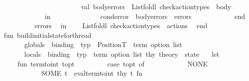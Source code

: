 \begin{isabellebody}
\ \ \ \ \ \ \ \ \isanewline
\ \ \ \ \ \ \ \ \ \ \ \ \ \ val\ body{\isacharunderscore}{\kern0pt}errors\ {\isacharequal}{\kern0pt}\ List{\isachardot}{\kern0pt}foldl\ check{\isacharunderscore}{\kern0pt}action{\isacharunderscore}{\kern0pt}types\ {\isacharbrackleft}{\kern0pt}{\isacharbrackright}{\kern0pt}\ body\isanewline
\ \ \ \ \ \ \ \ \ \ \ \ in\isanewline
\ \ \ \ \ \ \ \ \ \ \ \ \ \ cond{\isacharunderscore}{\kern0pt}error\ {\isacharat}{\kern0pt}\ body{\isacharunderscore}{\kern0pt}errors\ {\isacharat}{\kern0pt}\ errors\isanewline
\ \ \ \ \ \ \ \ \ \ \ \ end\isanewline
\isanewline
\ \ \ \ \ \ {\isacharbar}{\kern0pt}\ {\isacharunderscore}{\kern0pt}\ {\isacharequal}{\kern0pt}{\isachargreater}{\kern0pt}\ errors\isanewline
\isanewline
\ \ in\isanewline
\ \ \ \ List{\isachardot}{\kern0pt}foldl\ check{\isacharunderscore}{\kern0pt}action{\isacharunderscore}{\kern0pt}types\ {\isacharbrackleft}{\kern0pt}{\isacharbrackright}{\kern0pt}\ actions\isanewline
\ \ end\isanewline
\isanewline
fun\ build{\isacharunderscore}{\kern0pt}initial{\isacharunderscore}{\kern0pt}state{\isacharunderscore}{\kern0pt}for{\isacharunderscore}{\kern0pt}thread\ \isanewline
\ \ \ \ \ \ {\isacharparenleft}{\kern0pt}globals\ {\isacharcolon}{\kern0pt}\ {\isacharparenleft}{\kern0pt}binding\ {\isacharasterisk}{\kern0pt}\ typ\ {\isacharasterisk}{\kern0pt}\ Position{\isachardot}{\kern0pt}T\ {\isacharasterisk}{\kern0pt}\ term\ option{\isacharparenright}{\kern0pt}\ list{\isacharparenright}{\kern0pt}\ \isanewline
\ \ \ \ \ \ {\isacharparenleft}{\kern0pt}locals\ {\isacharcolon}{\kern0pt}\ {\isacharparenleft}{\kern0pt}{\isacharparenleft}{\kern0pt}binding\ {\isacharasterisk}{\kern0pt}\ typ{\isacharparenright}{\kern0pt}\ {\isacharasterisk}{\kern0pt}\ term\ option{\isacharparenright}{\kern0pt}\ list{\isacharparenright}{\kern0pt}\ {\isacharparenleft}{\kern0pt}thy{\isacharcolon}{\kern0pt}\ theory{\isacharparenright}{\kern0pt}\ {\isacharcolon}{\kern0pt}\ state\ {\isacharequal}{\kern0pt}\isanewline
\ \ let\isanewline
\ \ \ \ fun\ term{\isacharunderscore}{\kern0pt}to{\isacharunderscore}{\kern0pt}int\ t{\isacharunderscore}{\kern0pt}opt\ {\isacharequal}{\kern0pt}\isanewline
\ \ \ \ \ \ \ \ case\ t{\isacharunderscore}{\kern0pt}opt\ of\isanewline
\ \ \ \ \ \ \ \ \ \ \ \ NONE\ {\isacharequal}{\kern0pt}{\isachargreater}{\kern0pt}\ {}\isanewline
\ \ \ \ \ \ \ \ \ \ {\isacharbar}{\kern0pt}\ SOME\ t\ {\isacharequal}{\kern0pt}{\isachargreater}{\kern0pt}\ eval{\isacharunderscore}{\kern0pt}term{\isacharunderscore}{\kern0pt}to{\isacharunderscore}{\kern0pt}int\ thy\ t\ {\isacharparenleft}{\kern0pt}fn\ {\isacharunderscore}{\kern0pt}\ {\isacharequal}{\kern0pt}{\isachargreater}{\kern0pt}\ {}{\isacharparenright}{\kern0pt}\isanewline

\end{isabellebody}
